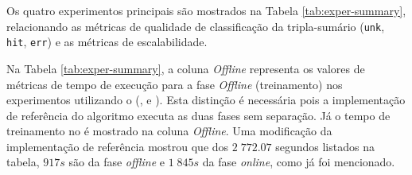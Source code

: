 Os quatro experimentos principais são mostrados na Tabela
\ref{tab:exper-summary}, relacionando as métricas de qualidade de classificação
da tripla-sumário (\texttt{unk}, \texttt{hit}, \texttt{err}) e as métricas de
escalabilidade.

Na Tabela \ref{tab:exper-summary}, a coluna \emph{Offline} representa os valores
de métricas de tempo de execução para a fase \emph{Offline} (treinamento) nos
experimentos utilizando o \mfog (\expB, \expC e \expD).
Esta distinção é necessária pois a implementação de referência do algoritmo
\minas executa as duas fases sem separação. Já o tempo de treinamento no \mfog é
mostrado na coluna \emph{Offline}.
Uma modificação da implementação de referência mostrou que dos $2\;772.07$
segundos listados na tabela, $917s$ são da fase \emph{offline} e $1\;845s$ da
fase \emph{online}, como já foi mencionado.

\newcommand{\mr}[1]{\multirow{2}{*}{\texttt{#1}}}

